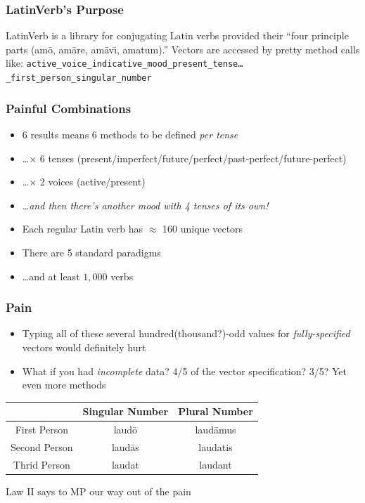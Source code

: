 \documentclass[slidestop,compress,mathserif]{beamer}
\begin{document}
\begin{frame}
	\frametitle{LatinVerb's Purpose}
	LatinVerb is a library for conjugating Latin verbs provided their ``four principle parts (am\={o}, am\={a}re, am\={a}v\={\i}, amatum).''
	\pause
	\vskip 0.5cm
	Vectors are accessed by pretty method calls like: \texttt{active\_voice\_indicative\_mood\_present\_tense{\ldots}\\\_first\_person\_singular\_number}
\end{frame}

\begin{frame}
	\frametitle{Painful Combinations}
	\begin{itemize}
		\item 6 results means 6 methods to be defined \emph{per tense}
		\pause
		\item \ldots $\times$ 6 tenses (present/imperfect/future/perfect/past-perfect/future-perfect)
		\pause
		\item \ldots $\times$ 2 voices (active/present)
		\pause
		\item \ldots \emph{and then there's another mood with 4 tenses of its own!}
		\pause
		\item Each regular Latin verb has $\approx$  160 unique vectors
		\pause
		\item There are 5 standard paradigms
		\pause
		\item \ldots and at least $1,000$ verbs
	\end{itemize}
\end{frame}

\begin{frame}
		\frametitle{Pain}
		\begin{itemize}
			\item Typing all of these several hundred(thousand?)-odd values for \emph{fully-specified} vectors would definitely hurt
			\pause
			\item What if you had \emph{incomplete} data?  4/5 of the vector specification?  3/5?  Yet even more methods
		\end{itemize}
		\begin{center}
			\begin{tabular}{|c|c|c|}
				\hline
				  & Singular Number &  Plural Number\\
				\hline
				First Person  & laud\={o}  & laud\={a}mus\\
				Second Person & laud\={a}s & laudatis \\
				Thrid Person  & laudat     & laudant \\
				\hline
			\end{tabular}
		\end{center}
		\pause
		Law II says to MP our way out of the pain
\end{frame}
\end{document}
